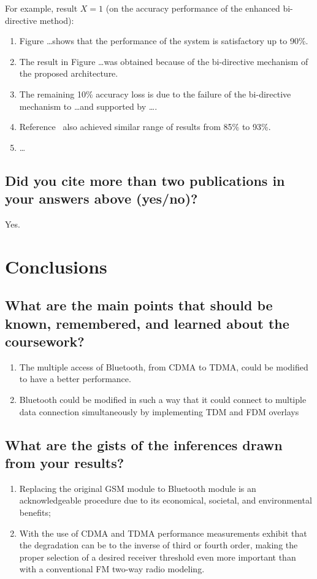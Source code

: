 For example, result $X = 1$ (on the accuracy performance of the enhanced bi-directive method):

\begin{enumerate}
	\item Figure \ldots shows that the performance of the system is satisfactory up to 90\%.
	\item The result in Figure \ldots was obtained because of the bi-directive mechanism of the proposed architecture.
	\item The remaining 10\% accuracy loss is due to the failure of the bi-directive mechanism to \ldots and supported by \ldots.
	\item Reference~\cite{Einstein1905} also achieved similar range of results from 85\% to 93\%.
	\item \ldots
\end{enumerate}

\subsection{Did you cite more than two publications in your answers above (yes/no)?}
Yes.	

\section{Conclusions}
\label{sec:conc}

\subsection{What are the main points that should be known, remembered, and learned about the coursework?}
\begin{enumerate}
	\item The multiple access of Bluetooth, from CDMA to TDMA, could be modified to have a better performance.
	\item Bluetooth could be modified in such a way that it could connect to multiple data connection simultaneously by implementing TDM and FDM overlays
\end{enumerate}

\subsection{What are the gists of the inferences drawn from your results?}
\begin{enumerate}
	\item Replacing the original GSM module to Bluetooth module is an acknowledgeable procedure due to its economical, societal, and environmental benefits;
	\item With the use of CDMA and TDMA performance measurements exhibit that the degradation can be to the inverse of third or fourth order, making the proper selection of a desired receiver threshold even more important than with a conventional FM two-way radio modeling.
\end{enumerate}

